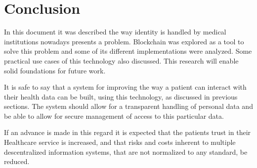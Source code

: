 \documentclass[notitlepage]{llncs}
\begin{document}

\section{Conclusion} \label{conclusion}
In this document it was described the way identity is handled by medical institutions nowadays presents a problem. Blockchain was explored as a tool to solve this problem and some of its different implementations were analyzed. Some practical use cases of this technology also discussed. This research will enable solid foundations for future work.
\par
It is safe to say that a system for improving the way a patient can interact with their health data can be built, using this technology, as discussed in previous sections. The system should allow for a transparent handling of personal data and be able to allow for secure management of access to this particular data.
\par
If an advance is made in this regard it is expected that the patients trust in their Healthcare service is increased, and that risks and costs inherent to multiple descentralized information systems, that are not normalized to any standard, be reduced. 
\newpage


\begingroup
\nocite{*}
\raggedright


\endgroup
\end{document}
